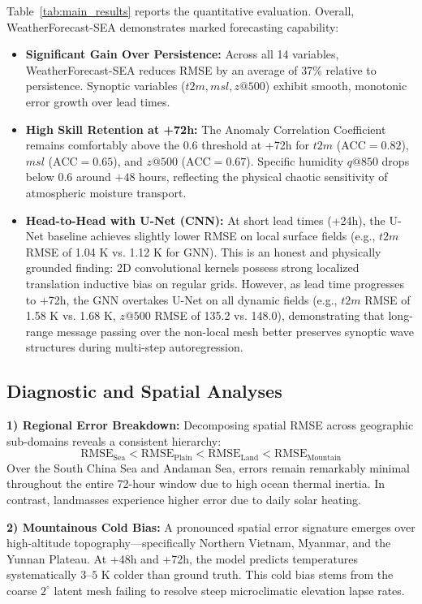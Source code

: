 Table~\ref{tab:main_results} reports the quantitative evaluation. Overall, WeatherForecast-SEA demonstrates marked forecasting capability:
\begin{itemize}
    \item \textbf{Significant Gain Over Persistence:} Across all 14 variables, WeatherForecast-SEA reduces RMSE by an average of 37\% relative to persistence. Synoptic variables ($t2m, msl, z@500$) exhibit smooth, monotonic error growth over lead times.
    \item \textbf{High Skill Retention at +72h:} The Anomaly Correlation Coefficient remains comfortably above the $0.6$ threshold at +72h for $t2m$ ($\text{ACC} = 0.82$), $msl$ ($\text{ACC} = 0.65$), and $z@500$ ($\text{ACC} = 0.67$). Specific humidity $q@850$ drops below 0.6 around $+48$ hours, reflecting the physical chaotic sensitivity of atmospheric moisture transport.
    \item \textbf{Head-to-Head with U-Net (CNN):} At short lead times (+24h), the U-Net baseline achieves slightly lower RMSE on local surface fields (e.g., $t2m$ RMSE of 1.04 K vs. 1.12 K for GNN). This is an honest and physically grounded finding: 2D convolutional kernels possess strong localized translation inductive bias on regular grids. However, as lead time progresses to +72h, the GNN overtakes U-Net on all dynamic fields (e.g., $t2m$ RMSE of 1.58 K vs. 1.68 K, $z@500$ RMSE of 135.2 vs. 148.0), demonstrating that long-range message passing over the non-local mesh better preserves synoptic wave structures during multi-step autoregression.
\end{itemize}

\subsection{Diagnostic and Spatial Analyses}

\textbf{1) Regional Error Breakdown:}
Decomposing spatial RMSE across geographic sub-domains reveals a consistent hierarchy:
$$\text{RMSE}_{\text{Sea}} < \text{RMSE}_{\text{Plain}} < \text{RMSE}_{\text{Land}} < \text{RMSE}_{\text{Mountain}}$$
Over the South China Sea and Andaman Sea, errors remain remarkably minimal throughout the entire 72-hour window due to high ocean thermal inertia. In contrast, landmasses experience higher error due to daily solar heating.

\textbf{2) Mountainous Cold Bias:}
A pronounced spatial error signature emerges over high-altitude topography—specifically Northern Vietnam, Myanmar, and the Yunnan Plateau. At +48h and +72h, the model predicts temperatures systematically $3\text{--}5\text{ K}$ colder than ground truth. This cold bias stems from the coarse $2^\circ$ latent mesh failing to resolve steep microclimatic elevation lapse rates.

